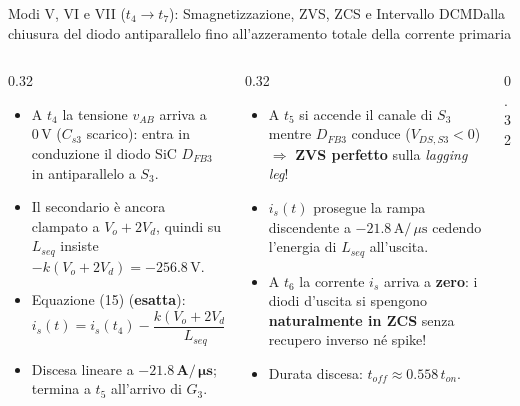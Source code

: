 \documentclass[aspectratio=169,9pt]{beamer}
\newcommand{\V}{\,\text{V}}
\newcommand{\A}{\,\text{A}}
\newcommand{\us}{\,\mu\text{s}}
\begin{document}
\begin{frame}{Modi V, VI e VII ($t_4 \to t_7$): Smagnetizzazione, ZVS, ZCS e Intervallo DCM}{Dalla chiusura del diodo antiparallelo fino all'azzeramento totale della corrente primaria}
  \begin{columns}[T,onlytextwidth]
    \begin{column}{0.32\textwidth}
      \begin{formulabox}[title={Modo V ($t_4 \le t \le t_5$) --- Dead-Time}]
        \begin{itemize}\setlength{\itemsep}{2pt}
          \item A $t_4$ la tensione $v_{AB}$ arriva a $0\V$ ($C_{s3}$ scarico): entra in conduzione il diodo SiC \textbf{$D_{FB3}$} in antiparallelo a $S_3$.
          \item Il secondario \`e ancora clampato a $V_o+2V_d$, quindi su $L_{seq}$ insiste $-k(V_o+2V_d)=-256.8\V$.
          \item Equazione (15) (\textbf{esatta}):
            \[
              i_s(t) = i_s(t_4) - \frac{k(V_o+2V_d)}{L_{seq}}(t-t_4)
            \]
          \item Discesa lineare a $\mathbf{-21.8\A/\us}$; termina a $t_5$ all'arrivo di $G_3$.
        \end{itemize}
      \end{formulabox}
    \end{column}
    \begin{column}{0.32\textwidth}
      \begin{okbox}[title={Modo VI ($t_5 \le t \le t_6$) --- ZVS + ZCS}]
        \begin{itemize}\setlength{\itemsep}{2pt}
          \item A $t_5$ si accende il canale di $S_3$ mentre $D_{FB3}$ conduce ($V_{DS,S3}<0$) $\Rightarrow$ \textbf{ZVS perfetto} sulla \emph{lagging leg}!
          \item $i_s(t)$ prosegue la rampa discendente a $-21.8\A/\us$ cedendo l'energia di $L_{seq}$ all'uscita.
          \item A $t_6$ la corrente $i_s$ arriva a \textbf{zero}: i diodi d'uscita si spengono \textbf{naturalmente in ZCS} senza recupero inverso n\'e spike!
          \item Durata discesa: $t_{off} \approx 0.558\,t_{on}$.
        \end{itemize}
      \end{okbox}
    \end{column}
    \begin{column}{0.32\textwidth}

\end{column}
\end{columns}
\end{frame}
\end{document}
